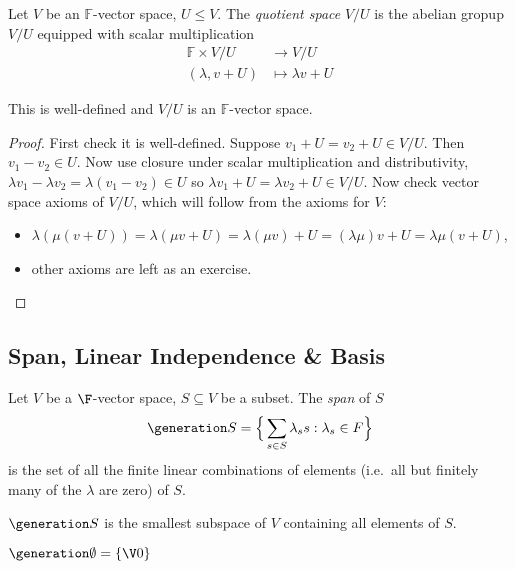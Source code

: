 \documentclass[a4paper]{article}
\theoremstyle{definition}
\begin{document}
\begin{definition}
  Let $V$ be an $\mathbb{F}$-vector space, $U \leq V$. The \emph{quotient space} $V/U$ is the abelian gropup $V/U$ equipped with scalar multiplication
  \begin{align*}
    \mathbb{F} \times V/U &\to V/U \\
    (\lambda, v+U) &\mapsto \lambda v+U
  \end{align*}
\end{definition}

\begin{proposition}
  This is well-defined and $V/U$ is an $\mathbb{F}$-vector space.
\end{proposition}

\begin{proof}
  First check it is well-defined. Suppose $v_1+U= v_2+U \in V/U$. Then $v_1-v_2\in U$. Now use closure under scalar multiplication and distributivity, $\lambda v_1 - \lambda v_2 = \lambda(v_1-v_2)\in U$ so $\lambda v_1 + U = \lambda v_2 +U\in V/U$.
  Now check vector space axioms of $V/U$, which will follow from the axioms for $V$:
  \begin{itemize}
  \item $\lambda(\mu(v+U)) = \lambda(\mu v+U) = \lambda(\mu v)+U = (\lambda\mu) v+U = \lambda\mu(v+U)$,
  \item other axioms are left as an exercise.
  \end{itemize}
\end{proof}

\subsection{Span, Linear Independence \& Basis}

\begin{definition}[Span]
  Let $V$ be a $\F$-vector space, $S \subseteq V$ be a subset. The \emph{span} of $S$
  \[
    \generation S = \Big\{\sum_{s\in S} \lambda_s s : \lambda_s \in F \Big\}
  \]
  is the set of all the finite linear combinations of elements (i.e.\ all but finitely many of the $\lambda$ are zero) of $S$.
\end{definition}

\begin{remark}
  $\generation S$ is the smallest subspace of $V$ containing all elements of $S$.
\end{remark}

\begin{convention}
  $\generation \emptyset = \{\V 0\}$
\end{convention}
\end{document}
